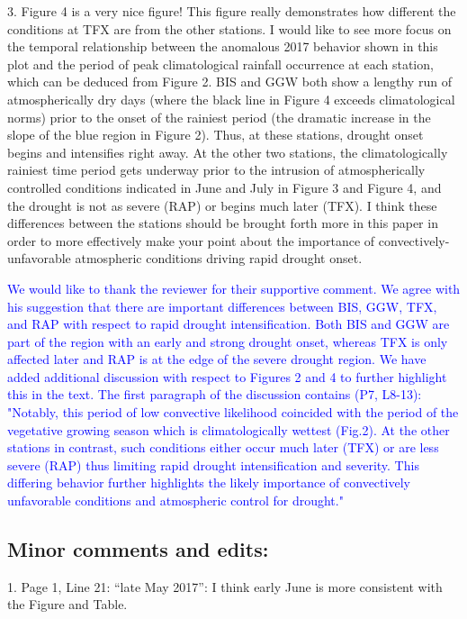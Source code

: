 \documentclass[hess, manuscript]{copernicus}
\def\TG{\textcolor{blue}}
\begin{document}
3.   Figure 4 is a very nice figure!   This figure really demonstrates how different the conditions at TFX are from the other stations.  I would like to see more focus on the temporal relationship between the anomalous 2017 behavior shown in this plot and the period of peak climatological rainfall occurrence at each station, which can be deduced from Figure 2.  BIS and GGW both show a lengthy run of atmospherically dry days (where the black line in Figure 4 exceeds climatological norms) prior to the onset of the rainiest period (the dramatic increase in the slope of the blue region in Figure 2). Thus, at these stations,  drought onset begins and intensifies right away.   At the other two stations, the climatologically rainiest time period gets underway prior to the intrusion of atmospherically controlled conditions indicated in June and July in Figure 3 and Figure 4, and the drought is not as severe (RAP) or begins much later (TFX). I think these differences between the stations should be brought forth more in this paper in order to more effectively make your point about the importance of convectively-unfavorable atmospheric conditions driving rapid drought onset. 

\TG{We would like to thank the reviewer for their supportive comment. We agree with his suggestion that there are important differences between BIS, GGW, TFX, and RAP with respect to rapid drought intensification. Both BIS and GGW are part of the region with an early and strong drought onset, whereas TFX is only affected later and RAP is at the edge of the severe drought region. We have added additional discussion with respect to Figures 2 and 4 to further highlight this in the text. The first paragraph of the discussion contains (P7, L8-13): "Notably, this period of low convective likelihood coincided with the period of the vegetative growing season which is climatologically wettest (Fig.2). At the other stations in contrast, such conditions either occur much later (TFX) or are less severe (RAP) thus limiting rapid drought intensification and severity. This differing behavior further highlights the likely importance of convectively unfavorable conditions and atmospheric control for drought."}

\subsection{Minor comments and edits:}
1.  Page 1, Line 21:  “late May 2017”:  I think early June is more consistent with the Figure and Table.
\end{document}
